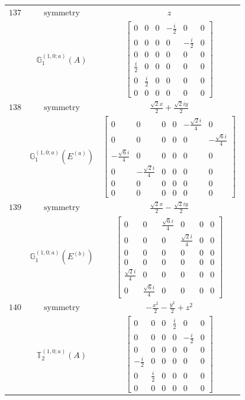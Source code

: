 \documentclass[fleqn,8pt,landscape]{jsarticle}
\begin{document}
\begin{longtable}{ccc}
$ 137 $ & $ \text{symmetry} $ & $ z $ \\
$  $ & $ \mathbb{G}_{1}^{(1,0;a)}(A) $ & $ \begin{bmatrix} 0 & 0 & 0 & - \frac{i}{2} & 0 & 0 \\ 0 & 0 & 0 & 0 & - \frac{i}{2} & 0 \\ 0 & 0 & 0 & 0 & 0 & 0 \\ \frac{i}{2} & 0 & 0 & 0 & 0 & 0 \\ 0 & \frac{i}{2} & 0 & 0 & 0 & 0 \\ 0 & 0 & 0 & 0 & 0 & 0 \end{bmatrix} $ \\ \hline
$ 138 $ & $ \text{symmetry} $ & $ \frac{\sqrt{2} x}{2} + \frac{\sqrt{2} i y}{2} $ \\
$  $ & $ \mathbb{G}_{1}^{(1,0;a)}(E^{(a)}) $ & $ \begin{bmatrix} 0 & 0 & 0 & 0 & - \frac{\sqrt{2} i}{4} & 0 \\ 0 & 0 & 0 & 0 & 0 & - \frac{\sqrt{6} i}{4} \\ - \frac{\sqrt{6} i}{4} & 0 & 0 & 0 & 0 & 0 \\ 0 & - \frac{\sqrt{2} i}{4} & 0 & 0 & 0 & 0 \\ 0 & 0 & 0 & 0 & 0 & 0 \\ 0 & 0 & 0 & 0 & 0 & 0 \end{bmatrix} $ \\ \hline
$ 139 $ & $ \text{symmetry} $ & $ \frac{\sqrt{2} x}{2} - \frac{\sqrt{2} i y}{2} $ \\
$  $ & $ \mathbb{G}_{1}^{(1,0;a)}(E^{(b)}) $ & $ \begin{bmatrix} 0 & 0 & \frac{\sqrt{6} i}{4} & 0 & 0 & 0 \\ 0 & 0 & 0 & \frac{\sqrt{2} i}{4} & 0 & 0 \\ 0 & 0 & 0 & 0 & 0 & 0 \\ 0 & 0 & 0 & 0 & 0 & 0 \\ \frac{\sqrt{2} i}{4} & 0 & 0 & 0 & 0 & 0 \\ 0 & \frac{\sqrt{6} i}{4} & 0 & 0 & 0 & 0 \end{bmatrix} $ \\ \hline
$ 140 $ & $ \text{symmetry} $ & $ - \frac{x^{2}}{2} - \frac{y^{2}}{2} + z^{2} $ \\
$  $ & $ \mathbb{T}_{2}^{(1,0;a)}(A) $ & $ \begin{bmatrix} 0 & 0 & 0 & \frac{i}{2} & 0 & 0 \\ 0 & 0 & 0 & 0 & - \frac{i}{2} & 0 \\ 0 & 0 & 0 & 0 & 0 & 0 \\ - \frac{i}{2} & 0 & 0 & 0 & 0 & 0 \\ 0 & \frac{i}{2} & 0 & 0 & 0 & 0 \\ 0 & 0 & 0 & 0 & 0 & 0 \end{bmatrix} $ \\ \hline

\end{longtable}
\end{document}
